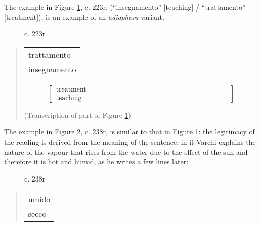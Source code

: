 \begin{paper}
The example in Figure \ref{fig:italia9a}, c. 223r, (``insegnamento'' [teaching] / ``trattamento'' [treatment]), is an example of an \emph{adiaphora} variant.

\begin{figure}[H]
    \centering
    \caption{c. 223r}
    \label{fig:italia9a}
\end{figure}

\begin{quote}
\begin{center}

\begin{tabular}{p{}}
	trattamento \\ 
	insegnamento \\
\end{tabular}    
\end{center}

\begin{center}
\begin{equation*}
	\left[\begin{tabular}{p{.70\textwidth}}
   		\text{treatment} \\
    	\text{teaching} \\
	\end{tabular}\right]
\end{equation*}

\end{center}
\begin{flushright}
(Transcription of part of Figure \ref{fig:italia9a})
\end{flushright}
\end{quote}

\noindent The example in Figure \ref{fig:italia9b}, c. 238r, is similar to that in Figure \ref{fig:italia9a}:
the legitimacy of the reading is derived from the meaning of the
sentence; in it Varchi explains the nature of the vapour that rises from
the water due to the effect of the sun and therefore it is hot and
humid, as he writes a few lines later:

\begin{figure}[H]
    \centering
    \caption{c. 238r}
    \label{fig:italia9b}
\end{figure}

\begin{quote}
\begin{center}

\begin{tabular}{p{}}
	umido \\ 
	secco \\
\end{tabular}    
\end{center}


\end{quote}
\end{paper}
